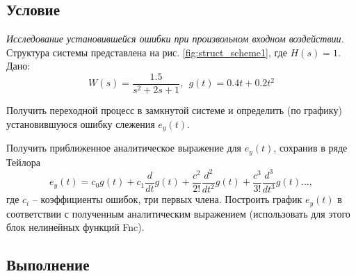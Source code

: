 \documentclass[a4paper, 12pt]{article}
\begin{document}
    \subsection{Условие}
    \textit{Исследование установившейся ошибки при произвольном входном воздействии.}
    Структура системы представлена на рис. \ref{fig:struct_scheme1}, где $H(s)=1$. Дано:
    $$W(s)=\dfrac{1.5}{s^2+2s+1},\ \ g(t)=0.4t+0.2t^2$$
    \begin{compactitem}
    \item Получить переходной процесс в замкнутой системе
    и определить (по графику) установившуюся ошибку слежения $e_y(t)$.
    \item Получить приближенное аналитическое выражение для $e_y(t)$, сохранив в
    ряде Тейлора $$e_y(t)=c_0g(t)+c_1\dfrac{d}{dt}g(t)+\dfrac{c^2}{2!}\dfrac{d^2}{dt^2}g(t)+\dfrac{c^3}{3!}\dfrac{d^3}{dt^3}g(t)...,$$
    где $c_i$ -- коэффициенты ошибок, три первых члена. Построить график $e_y(t)$
    в соответствии с полученным аналитическим выражением (использовать для этого блок нелинейных функций Fnc).
    \end{compactitem}


    \subsection{Выполнение}
\end{document}
